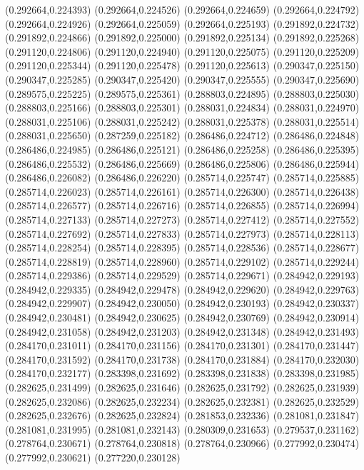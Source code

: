 (0.292664,0.224393)
(0.292664,0.224526)
(0.292664,0.224659)
(0.292664,0.224792)
(0.292664,0.224926)
(0.292664,0.225059)
(0.292664,0.225193)
(0.291892,0.224732)
(0.291892,0.224866)
(0.291892,0.225000)
(0.291892,0.225134)
(0.291892,0.225268)
(0.291120,0.224806)
(0.291120,0.224940)
(0.291120,0.225075)
(0.291120,0.225209)
(0.291120,0.225344)
(0.291120,0.225478)
(0.291120,0.225613)
(0.290347,0.225150)
(0.290347,0.225285)
(0.290347,0.225420)
(0.290347,0.225555)
(0.290347,0.225690)
(0.289575,0.225225)
(0.289575,0.225361)
(0.288803,0.224895)
(0.288803,0.225030)
(0.288803,0.225166)
(0.288803,0.225301)
(0.288031,0.224834)
(0.288031,0.224970)
(0.288031,0.225106)
(0.288031,0.225242)
(0.288031,0.225378)
(0.288031,0.225514)
(0.288031,0.225650)
(0.287259,0.225182)
(0.286486,0.224712)
(0.286486,0.224848)
(0.286486,0.224985)
(0.286486,0.225121)
(0.286486,0.225258)
(0.286486,0.225395)
(0.286486,0.225532)
(0.286486,0.225669)
(0.286486,0.225806)
(0.286486,0.225944)
(0.286486,0.226082)
(0.286486,0.226220)
(0.285714,0.225747)
(0.285714,0.225885)
(0.285714,0.226023)
(0.285714,0.226161)
(0.285714,0.226300)
(0.285714,0.226438)
(0.285714,0.226577)
(0.285714,0.226716)
(0.285714,0.226855)
(0.285714,0.226994)
(0.285714,0.227133)
(0.285714,0.227273)
(0.285714,0.227412)
(0.285714,0.227552)
(0.285714,0.227692)
(0.285714,0.227833)
(0.285714,0.227973)
(0.285714,0.228113)
(0.285714,0.228254)
(0.285714,0.228395)
(0.285714,0.228536)
(0.285714,0.228677)
(0.285714,0.228819)
(0.285714,0.228960)
(0.285714,0.229102)
(0.285714,0.229244)
(0.285714,0.229386)
(0.285714,0.229529)
(0.285714,0.229671)
(0.284942,0.229193)
(0.284942,0.229335)
(0.284942,0.229478)
(0.284942,0.229620)
(0.284942,0.229763)
(0.284942,0.229907)
(0.284942,0.230050)
(0.284942,0.230193)
(0.284942,0.230337)
(0.284942,0.230481)
(0.284942,0.230625)
(0.284942,0.230769)
(0.284942,0.230914)
(0.284942,0.231058)
(0.284942,0.231203)
(0.284942,0.231348)
(0.284942,0.231493)
(0.284170,0.231011)
(0.284170,0.231156)
(0.284170,0.231301)
(0.284170,0.231447)
(0.284170,0.231592)
(0.284170,0.231738)
(0.284170,0.231884)
(0.284170,0.232030)
(0.284170,0.232177)
(0.283398,0.231692)
(0.283398,0.231838)
(0.283398,0.231985)
(0.282625,0.231499)
(0.282625,0.231646)
(0.282625,0.231792)
(0.282625,0.231939)
(0.282625,0.232086)
(0.282625,0.232234)
(0.282625,0.232381)
(0.282625,0.232529)
(0.282625,0.232676)
(0.282625,0.232824)
(0.281853,0.232336)
(0.281081,0.231847)
(0.281081,0.231995)
(0.281081,0.232143)
(0.280309,0.231653)
(0.279537,0.231162)
(0.278764,0.230671)
(0.278764,0.230818)
(0.278764,0.230966)
(0.277992,0.230474)
(0.277992,0.230621)
(0.277220,0.230128)
